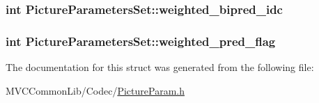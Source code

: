 \label{struct_picture_parameters_set_a9611d788502cf2646a1fafd8f1cc7e4f}
\hypertarget{struct_picture_parameters_set_a436591953af7e22c28e0e2844acdf9f3}{
\subsubsection[{weighted\_\-bipred\_\-idc}]{\setlength{\rightskip}{0pt plus 5cm}int {\bf PictureParametersSet::weighted\_\-bipred\_\-idc}}}
\label{struct_picture_parameters_set_a436591953af7e22c28e0e2844acdf9f3}
\hypertarget{struct_picture_parameters_set_a4cd484fee6229fd37fa2bf7519458f3a}{
\subsubsection[{weighted\_\-pred\_\-flag}]{\setlength{\rightskip}{0pt plus 5cm}int {\bf PictureParametersSet::weighted\_\-pred\_\-flag}}}
\label{struct_picture_parameters_set_a4cd484fee6229fd37fa2bf7519458f3a}


The documentation for this struct was generated from the following file:\begin{DoxyCompactItemize}
\item 
MVCCommonLib/Codec/\hyperlink{_picture_param_8h}{PictureParam.h}\end{DoxyCompactItemize}
